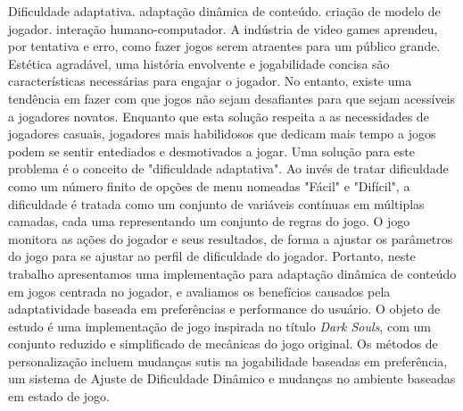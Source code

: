 \begin{englishabstract}{}{Dificuldade adaptativa. adaptação dinâmica de conteúdo. criação de modelo de jogador. interação humano-computador.}
    A indústria de video games aprendeu, por tentativa e erro, como fazer jogos serem atraentes para um público grande. Estética agradável, uma história envolvente e jogabilidade concisa são características necessárias para engajar o jogador. No entanto, existe uma tendência em fazer com que jogos não sejam desafiantes para que sejam acessíveis a jogadores novatos. Enquanto que esta solução respeita a as necessidades de jogadores casuais, jogadores mais habilidosos que dedicam mais tempo a jogos podem se sentir entediados e desmotivados a jogar. Uma solução para este problema é o conceito de "dificuldade adaptativa". Ao invés de tratar dificuldade como um número finito de opções de menu nomeadas "Fácil" e "Difícil", a dificuldade é tratada como um conjunto de variáveis contínuas em múltiplas camadas, cada uma representando um conjunto de regras do jogo. O jogo monitora as ações do jogador e seus resultados, de forma a ajustar os parâmetros do jogo para se ajustar ao perfil de dificuldade do jogador. Portanto, neste trabalho apresentamos uma implementação para adaptação dinâmica de conteúdo em jogos centrada no jogador, e avaliamos os benefícios causados pela adaptatividade baseada em preferências e performance do usuário. O objeto de estudo é uma implementação de jogo inspirada no título \emph{Dark Souls}, com um conjunto reduzido e simplificado de mecânicas do jogo original. Os métodos de personalização incluem mudanças sutis na jogabilidade baseadas em preferência, um sistema de Ajuste de Dificuldade Dinâmico e mudanças no ambiente baseadas em estado de jogo.
\end{englishabstract}